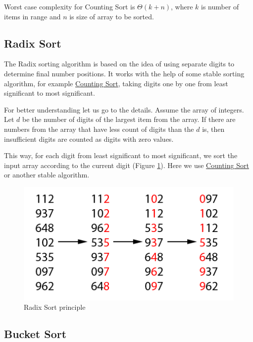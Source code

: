 \documentclass[
  field=inf,
  biblatex,
  language=english,
  glossaries,
  theorems=false,
  sourcecodes=false,
  index
]{kidiplom}
\begin{document}
Worst case complexity for Counting Sort is $\Theta(k + n)$, where $k$ is number of items in range and $n$ is size of array to be sorted.

\subsection{Radix Sort}
\label{sec:radixsort}

The Radix sorting algorithm is based on the idea of using separate digits to determine final number positions. It works with the help of some stable sorting algorithm, for example \hyperref[sec:counting]{Counting Sort}, taking digits one by one from least significant to most significant.

For better understanding let us go to the details. Assume the array of integers. Let $d$ be the number of digits of the largest item from the array. If there are numbers from the array that have less count of digits than the $d$ is, then insufficient digits are counted as digits with zero values.

This way, for each digit from least significant to most significant, we sort the input array according to the current digit (Figure \ref{fig:radixsort}). Here we use \hyperref[sec:counting]{Counting Sort} or another stable algorithm.

\begin{figure}[H]
\begin{center}
	
	\includegraphics[scale=2]{img/Radixsort.png}
	\caption{Radix Sort principle}\label{fig:radixsort}
\end{center}
\end{figure}

\subsection{Bucket Sort}
\label{sec:bucketsort}
\end{document}

